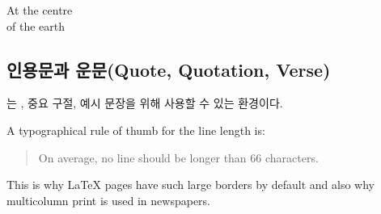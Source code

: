 \vspace{-.5\onelineskip}

\begin{example}
\begin{center}
At the centre\\of the earth
\end{center}
\end{example}

\subsection{인용문과 운문(Quote, Quotation, Verse)}

는 , 중요 구절, 예시 문장을 위해 사용할 수 있는 환경이다.

%

\begin{example}
A typographical rule of thumb
for the line length is:
\begin{quote}
On average, no line should
be longer than 66 characters.
\end{quote}
This is why \LaTeX{} pages have
such large borders by default
and also why multicolumn print
is used in newspapers.
\end{example}



